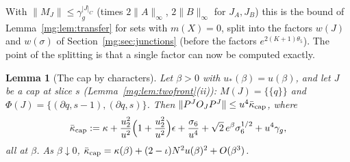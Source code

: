 \documentclass[11pt,a4paper]{article}
\newtheorem{lemma}[theorem]{Lemma}
\theoremstyle{definition}
\theoremstyle{remark}
\newcommand{\norm}[1]{\lVert #1\rVert}
\begin{document}
With $\norm{M_J}\le\gamma_g^{|J|_C}$ (times $2\norm A_\infty$, $2\norm B_\infty$ for $J_A,J_B$) this is the bound of Lemma~\ref{mg:lem:transfer} for sets with
$m(X)=0$, split into the factors $w(J)$ and $w(\sigma)$ of Section~\ref{mg:sec:junctions} (before the factors $e^{2(K+1)\theta_5}$). The point of the
splitting is that a single factor can now be computed exactly.

\begin{lemma}[The cap by characters]\label{mg:lem:capchar}
Let $\beta>0$ with $u_*(\beta)=u(\beta)$, and let $J$ be a cap at slice $s$ (Lemma~\ref{mg:lem:twofront}(ii)): $M(J)=\{\{q\}\}$ and
$\Phi(J)=\{(\partial q,s-1),(\partial q,s)\}$. Then $\norm{P^JO_JP^J}\le u^4\bar\kappa_{\rm cap}$, where
\[
\bar\kappa_{\rm cap}:=\kappa+\frac{u_2^2}{u^2}\Bigl(1+\frac{u_2^2}{u^2}\Bigr)\epsilon+\frac{\sigma_6}{u^4}+\sqrt2\,e^\beta\sigma_6^{1/2}+u^4\gamma_g ,
\]
all at $\beta$. As $\beta\downarrow0$, $\bar\kappa_{\rm cap}=\kappa(\beta)+(2-\iota)N^2u(\beta)^2+O(\beta^3)$.
\end{lemma}
\end{document}
